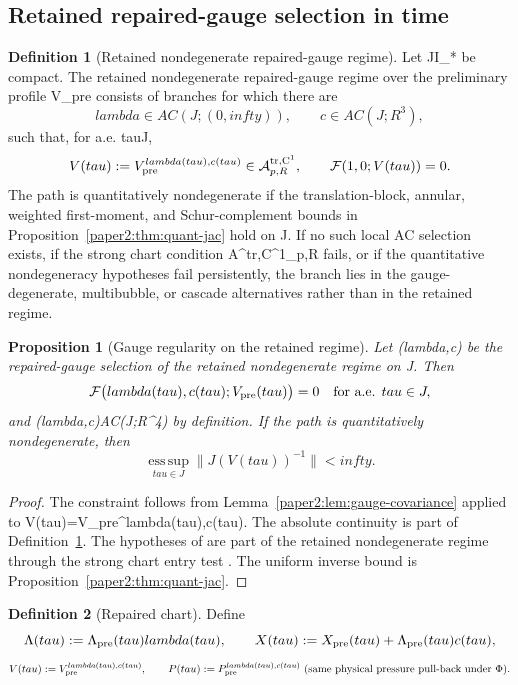 \documentclass[11pt]{amsart}
\def\({}%
\def\){}%
\def\mathbb#1{#1}%
\def\tau{tau}%
\def\lambda{lambda}%
\def\infty{infty}%
\theoremstyle{plain}
\newtheorem{proposition}[proposition]{Proposition}
\theoremstyle{definition}
\newtheorem{definition}[definition]{Definition}
\theoremstyle{remark}
\begin{document}
\subsection{Retained repaired-gauge selection in time}\label{paper2:sec:gauge-solve}

\begin{definition}[Retained nondegenerate repaired-gauge regime]\label{paper2:def:admissible-gauge-path}
Let \(J\subset I_*\) be compact. The retained nondegenerate repaired-gauge
regime over the preliminary profile \(V_{\rm pre}\) consists of branches for
which there are
\[
\lambda\in AC(J;(0,\infty)),\qquad c\in AC(J;\mathbb R^3),
\]
such that, for a.e. \(\tau\in J\),
\[
V(\tau):=V_{\rm pre}^{\lambda(\tau),c(\tau)}
\in\mathcal A^{\rm tr,C^1}_{p,R},\qquad
\mathcal F(1,0;V(\tau))=0.
\]
The path is quantitatively nondegenerate if the translation-block, annular,
weighted first-moment, and Schur-complement bounds in
Proposition~\ref{paper2:thm:quant-jac} hold on \(J\).
If no such local AC selection exists, if the strong chart condition
\(\mathcal A^{\rm tr,C^1}_{p,R}\) fails, or if the quantitative
nondegeneracy hypotheses fail persistently, the branch lies in the
gauge-degenerate,
multibubble, or cascade alternatives rather than in the retained regime.
\end{definition}

\begin{proposition}[Gauge regularity on the retained regime]\label{paper2:prop:preliminary-correction}
Let \((\lambda,c)\) be the repaired-gauge selection of the retained
nondegenerate regime on \(J\). Then
\[
\mathcal F\bigl(\lambda(\tau),c(\tau);V_{\rm pre}(\tau)\bigr)=0
\quad\text{for a.e. }\tau\in J,
\]
and \((\lambda,c)\in AC(J;\mathbb R^4)\) by definition. If the path is
quantitatively nondegenerate, then
\[
\operatorname*{ess\,sup}_{\tau\in J}\|J(V(\tau))^{-1}\|<\infty.
\]
\end{proposition}
\begin{proof}
The constraint follows from Lemma~\ref{paper2:lem:gauge-covariance} applied to
\(V(\tau)=V_{\rm pre}^{\lambda(\tau),c(\tau)}\). The absolute continuity is part
of Definition~\ref{paper2:def:admissible-gauge-path}. The hypotheses of
 are part of the retained nondegenerate regime
through the strong chart entry test
. The uniform inverse bound is
Proposition~\ref{paper2:thm:quant-jac}.
\end{proof}

\begin{definition}[Repaired chart]\label{paper2:def:repaired-chart}
Define
\[
\Lambda(\tau):=\Lambda_{\rm pre}(\tau)\lambda(\tau),\qquad
X(\tau):=X_{\rm pre}(\tau)+\Lambda_{\rm pre}(\tau)c(\tau),
\]
\[
V(\tau):=V_{\rm pre}^{\lambda(\tau),c(\tau)},\qquad
P(\tau):=P_{\rm pre}^{\lambda(\tau),c(\tau)}\ \text{(same physical pressure pull-back under }\Phi).
\]
\end{definition}
\end{document}
